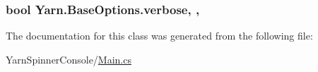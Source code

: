 \hypertarget{a00020_ada4d83d1756918f362d55f6649b82b17}{
\subsubsection[{verbose}]{\setlength{\rightskip}{0pt plus 5cm}bool Yarn.\-Base\-Options.\-verbose\hspace{0.3cm}{\ttfamily [get]}, {\ttfamily [set]}, {\ttfamily [inherited]}}}\label{a00020_ada4d83d1756918f362d55f6649b82b17}


The documentation for this class was generated from the following file\-:\begin{DoxyCompactItemize}
\item 
Yarn\-Spinner\-Console/\hyperlink{a00271}{Main.\-cs}\end{DoxyCompactItemize}
